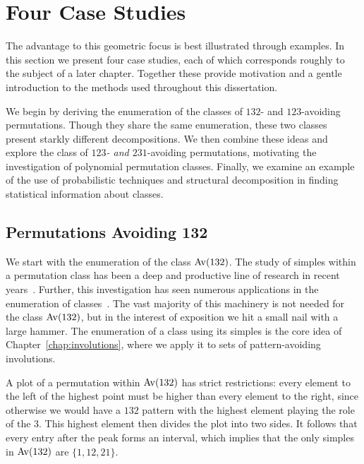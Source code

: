 \section{Four Case Studies}


  The advantage to this geometric focus is best illustrated through 
  examples. In this section we present four case studies, each of which
  corresponds roughly to the subject of a later chapter. Together these provide
  motivation and a gentle introduction to the methods used throughout this
  dissertation.
  
  We begin by deriving the 
  enumeration of the classes of $132$- and $123$-avoiding permutations. Though
  they share the same enumeration, these two classes present starkly different
  decompositions. We then combine these ideas and explore the class of
  \emph{$123$- and $231$}-avoiding permutations, motivating the investigation
  of polynomial permutation classes. Finally, we examine an example of the use of
  probabilistic techniques and structural decomposition in finding
  statistical information about classes. 



  \subsection{Permutations Avoiding 132}
  \label{prelim:sec:av132}

    
    We start with the enumeration of the class $\operatorname{{Av}} (132)$.  The study of
    simples within a permutation class has been a deep and productive line of
    research in recent years~\cite{Brignall2008, Atkinson2005, Brignall2007}.  
    Further, this investigation has seen numerous applications in the
    enumeration of classes~\cite{pantone2013,pantone2014, Albert2012}.
    The vast majority of this machinery is not needed for the class $\operatorname{{Av}}
    (132)$, but in the interest of exposition we hit a small nail with a large
    hammer.  The enumeration of a class using its simples is the core idea of
    Chapter~\ref{chap:involutions}, where we apply it to sets of
    pattern-avoiding involutions. 
    
    A plot of a permutation within $\operatorname{{Av}} (132)$ has strict restrictions: every
    element to the left of the highest point must be higher than every element
    to the right, since otherwise we would have a $132$ pattern with the
    highest element playing the role of the 3. This highest element then
    divides the plot into two sides. It follows that every entry after the
    peak forms an interval, which implies that the only simples in $\operatorname{{Av}} (132)$
    are $\{1, 12, 21\}$. 



